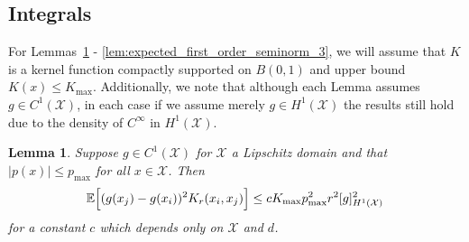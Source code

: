 \documentclass{article}
\newcommand{\abs}[1]{\left \lvert #1 \right \rvert}
\newcommand{\1}{\mathbf{1}}
\newcommand{\Xset}{\mathcal{X}}
\newcommand{\Ebb}{\mathbb{E}}
\theoremstyle{alden}
\theoremstyle{aldenthm}
\newtheorem{lemma}{Lemma}
\theoremstyle{definition}
\theoremstyle{remark}
\begin{document}
\subsection{Integrals}

For Lemmas~\ref{lem:expected_first_order_seminorm} - \ref{lem:expected_first_order_seminorm_3}, we will assume that $K$ is a kernel function compactly supported on $B(0,1)$ and upper bound $K(x) \leq K_{\max}$. Additionally, we note that although each Lemma assumes $g \in C^1(\Xset)$, in each case if we assume merely $g \in H^1(\Xset)$ the results still hold due to the density of $C^{\infty}$ in $H^1(\Xset)$.

\begin{lemma}
	\label{lem:expected_first_order_seminorm}
	Suppose $g \in C^{1}(\Xset)$ for $\Xset$ a Lipschitz domain and that $\abs{p(x)} \leq p_{\max}$ for all $x \in \Xset$. Then
	\begin{equation*}
	\Ebb\Bigl[(g(x_j) - g(x_i))^2K_r(x_i,x_j)\Bigr] \leq c K_{\max} p_{\max}^2 r^2 [g]_{H^1(\Xset)}^2
	\end{equation*}
	for a constant $c$ which depends only on $\Xset$ and $d$.
\end{lemma}
\end{document}
